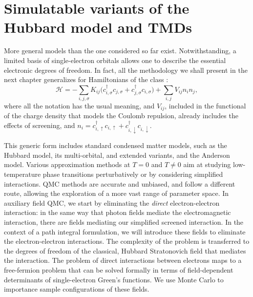 \section{Simulatable variants of the Hubbard model and TMDs}\label{sec:variants}

More general  models than the one considered so far exist.
Notwithstanding, a limited basis of single-electron orbitals allows one to describe the essential electronic degrees of freedom.
In fact, all the methodology we shall present in the next chapter generalizes for Hamiltonians of the class \cite{hanke_electronic_nodate}:
\begin{equation}\label{eq:variantsForm}
\mathcal{H} = - \sum_{i, j, \sigma} K_{ij} \bigg( c_{i, \sigma}^\dagger c_{j, \sigma} + c_{j, \sigma}^\dagger c_{i, \sigma} \bigg) + \sum_{i, j} V_{ij} n_i n_j ,
\end{equation}
where all the notation has the usual meaning, and $V_{ij}$, included in the functional of the charge density that models the Coulomb repulsion, already includes the effects of screening, and $n_i = c_{i,\uparrow}^\dagger c_{i,\uparrow} + c_{i,\downarrow}^\dagger c_{i,\downarrow}$.

This generic form includes standard condensed matter models, such as the Hubbard model, its multi-orbital, and extended variants, and the Anderson model.
Various approximation methods at $T = 0$ and $T \neq 0$ aim at studying low-temperature phase transitions perturbatively or by considering simplified interactions.
\ac{QMC} methods are accurate and unbiased, and follow a different route, allowing the exploration of a more vast range of parameter space.
In auxiliary field \ac{QMC}, we start by eliminating the \emph{direct} electron-electron interaction: in the same way that photon fields mediate the electromagnetic interaction, there are fields mediating our simplified screened interaction.
In the context of a path integral formulation, we will introduce these fields to eliminate the electron-electron interactions.
The complexity of the problem is transferred to the degrees of freedom of the classical, Hubbard Stratonovich field that mediates the interaction.
The problem of direct interactions between electrons maps to a free-fermion problem that can be solved formally in terms of field-dependent determinants of single-electron Green's functions.
We use Monte Carlo to importance sample configurations of these fields.

